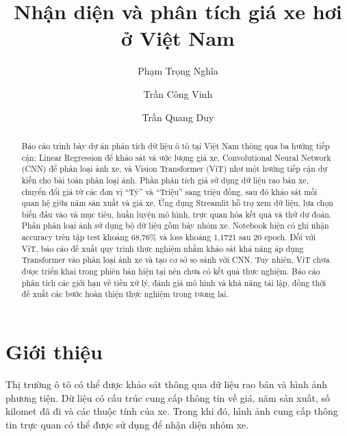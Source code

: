 \documentclass[runningheads]{llncs}
\begin{document}
\title{Nhận diện và phân tích giá xe hơi ở Việt Nam}

\author{Phạm Trọng Nghĩa \and
    Trần Công Vinh \and
    Trần Quang Duy}



\maketitle

\begin{abstract}
    Báo cáo trình bày dự án phân tích dữ liệu ô tô tại Việt Nam
    thông qua ba hướng tiếp cận: Linear Regression để khảo sát và
    ước lượng giá xe, Convolutional Neural Network (CNN) để phân
    loại ảnh xe, và Vision Transformer (ViT) như một hướng tiếp
    cận dự kiến cho bài toán phân loại ảnh. Phần phân tích giá
    sử dụng dữ liệu rao bán xe, chuyển đổi giá từ các đơn vị
    ``Tỷ'' và ``Triệu'' sang triệu đồng, sau đó khảo sát mối
    quan hệ giữa năm sản xuất và giá xe. Ứng dụng Streamlit
    hỗ trợ xem dữ liệu, lựa chọn biến đầu vào và mục tiêu,
    huấn luyện mô hình, trực quan hóa kết quả và thử dự đoán.
    Phần phân loại ảnh sử dụng bộ dữ liệu gồm bảy nhóm xe.
    Notebook hiện có ghi nhận accuracy trên tập test khoảng
    68,76\% và loss khoảng 1,1721 sau 20 epoch. Đối với ViT,
    báo cáo đề xuất quy trình thực nghiệm nhằm khảo sát khả năng
    áp dụng Transformer vào phân loại ảnh xe và tạo cơ sở so
    sánh với CNN. Tuy nhiên, ViT chưa được triển khai trong
    phiên bản hiện tại nên chưa có kết quả thực nghiệm. Báo cáo
    phân tích các giới hạn về tiền xử lý, đánh giá mô hình và
    khả năng tái lập, đồng thời đề xuất các bước hoàn thiện
    thực nghiệm trong tương lai.

\end{abstract}

\section{Giới thiệu}

Thị trường ô tô có thể được khảo sát thông qua dữ liệu rao
bán và hình ảnh phương tiện. Dữ liệu có cấu trúc cung cấp
thông tin về giá, năm sản xuất, số kilomet đã đi và các
thuộc tính của xe. Trong khi đó, hình ảnh cung cấp thông
tin trực quan có thể được sử dụng để nhận diện nhóm xe.
\end{document}
